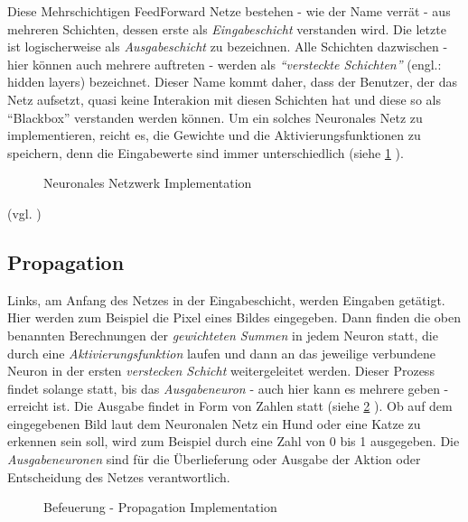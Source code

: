 \documentclass[parskip=half,titlepage]{scrartcl}
\begin{document}
Diese Mehrschichtigen FeedForward Netze bestehen - wie der Name verrät - aus mehreren Schichten, dessen erste als \textit{Eingabeschicht} verstanden wird. Die letzte ist logischerweise als \textit{Ausgabeschicht} zu bezeichnen. Alle Schichten dazwischen - hier können auch mehrere auftreten - werden als \textit{``versteckte Schichten''} (engl.: hidden layers) bezeichnet. Dieser Name kommt daher, dass der Benutzer, der das Netz aufsetzt, quasi keine Interakion mit diesen Schichten hat und diese so als ``Blackbox'' verstanden werden können. Um ein solches Neuronales Netz zu implementieren, reicht es, die Gewichte und die Aktivierungsfunktionen zu speichern, denn die Eingabewerte sind immer unterschiedlich (siehe \cref{fig:ffn_implementierung} ).

\begin{figure}[h]
 
 \caption{Neuronales Netzwerk Implementation}
 \label{fig:ffn_implementierung}
\end{figure}

(vgl. \cite{feed-forward_nn} )
\newpage

\subsection{Propagation}

Links, am Anfang des Netzes in der Eingabeschicht, werden Eingaben getätigt. Hier werden zum Beispiel die Pixel eines Bildes eingegeben. Dann finden die oben benannten Berechnungen der \textit{gewichteten Summen} in jedem Neuron statt, die durch eine \textit{Aktivierungsfunktion} laufen und dann an das jeweilige verbundene Neuron in der ersten \textit{verstecken Schicht} weitergeleitet werden. Dieser Prozess findet solange statt, bis das \textit{Ausgabeneuron} - auch hier kann es mehrere geben - erreicht ist. Die Ausgabe findet in Form von Zahlen statt (siehe \cref{fig:propagation} ). Ob auf dem eingegebenen Bild laut dem Neuronalen Netz ein Hund oder eine Katze zu 
erkennen sein soll, wird zum Beispiel durch eine Zahl von 0 bis 1 ausgegeben. Die \textit{Ausgabeneuronen} sind für die Überlieferung oder Ausgabe der Aktion oder Entscheidung des Netzes verantwortlich. 

\begin{figure}[h]
 
 \caption{Befeuerung - Propagation Implementation}
 \label{fig:propagation}
\end{figure}
\end{document}
